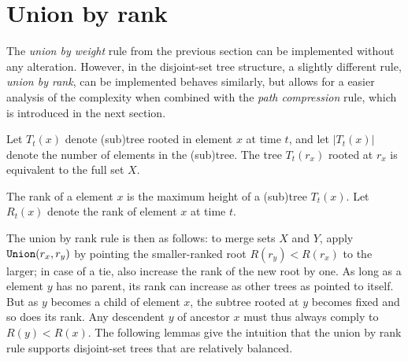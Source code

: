 \section{Union by rank}
The \emph{union by weight} rule from the previous section can be implemented without any alteration. However, in the disjoint-set tree structure, a slightly different rule, \emph{union by rank}, can be implemented behaves similarly, but allows for a easier analysis of the complexity when combined with the \emph{path compression} rule, which is introduced in the next section. 

\begin{definition}\label{def:tree}
  Let $T_t(x)$ denote (sub)tree rooted in element $x$ at time $t$, and let $|T_t(x)|$ denote the number of elements in the (sub)tree. The tree $T_t(r_x)$ rooted at $r_x$ is equivalent to the full set $X$.
\end{definition}
\begin{definition}\label{def:rank}
  The rank of a element $x$ is the maximum height of a (sub)tree $T_t(x)$. Let $R_t(x)$ denote the rank of element $x$ at time $t$. 
\end{definition}

The union by rank rule is then as follows: to merge sets $X$ and $Y$, apply $\texttt{Union}(r_x,r_y)$ by pointing the smaller-ranked root $R(r_y) < R(r_x)$ to the larger; in case of a tie, also increase the rank of the new root by one. As long as a element $y$ has no parent, its rank can increase as other trees as pointed to itself. But as $y$ becomes a child of element $x$, the subtree rooted at $y$ becomes fixed and so does its rank. Any descendent $y$ of ancestor $x$ must thus always comply to $R(y)<R(x)$. The following lemmas give the intuition that the union by rank rule supports disjoint-set trees that are relatively balanced.

